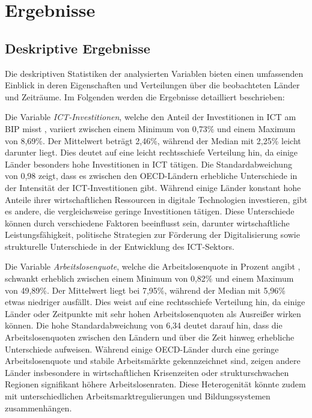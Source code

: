 
\section{Ergebnisse}


\subsection{Deskriptive Ergebnisse}

Die deskriptiven Statistiken der analysierten Variablen bieten einen umfassenden Einblick 
in deren Eigenschaften und Verteilungen über die beobachteten Länder und Zeiträume. Im 
Folgenden werden die Ergebnisse detailliert beschrieben:



Die Variable \textit{\ac{ICT}-Investitionen}, welche den Anteil der Investitionen in 
\ac{ICT} am \ac{BIP} misst \parencite{oecd2022ict}, variiert zwischen einem Minimum von 
0,73\% und einem Maximum von 8,69\%. Der Mittelwert beträgt 2,46\%, während der Median mit 
2,25\% leicht darunter liegt. Dies deutet auf eine leicht rechtsschiefe Verteilung hin, 
da einige Länder besonders hohe Investitionen in \ac{ICT} tätigen. Die Standardabweichung 
von 0,98 zeigt, dass es zwischen den OECD-Ländern erhebliche Unterschiede in der Intensität 
der \ac{ICT}-Investitionen gibt. Während einige Länder konstant hohe Anteile ihrer 
wirtschaftlichen Ressourcen in digitale Technologien investieren, gibt es andere, die 
vergleichsweise geringe Investitionen tätigen. Diese Unterschiede können durch verschiedene 
Faktoren beeinflusst sein, darunter wirtschaftliche Leistungsfähigkeit, politische 
Strategien zur Förderung der Digitalisierung sowie strukturelle Unterschiede in der 
Entwicklung des \ac{ICT}-Sektors.

Die Variable \textit{Arbeitslosenquote}, welche die Arbeitslosenquote in Prozent angibt 
\parencite{oecd2022unemployment}, schwankt erheblich zwischen einem Minimum von 0,82\% und 
einem Maximum von 49,89\%. Der Mittelwert liegt bei 7,95\%, während der Median mit 5,96\% 
etwas niedriger ausfällt. Dies weist auf eine rechtsschiefe Verteilung hin, da einige 
Länder oder Zeitpunkte mit sehr hohen Arbeitslosenquoten als Ausreißer wirken können. Die 
hohe Standardabweichung von 6,34 deutet darauf hin, dass die Arbeitslosenquoten 
zwischen den Ländern und über die Zeit hinweg erhebliche Unterschiede aufweisen. Während 
einige OECD-Länder durch eine geringe Arbeitslosenquote und stabile Arbeitsmärkte 
gekennzeichnet sind, zeigen andere Länder insbesondere in wirtschaftlichen Krisenzeiten 
oder strukturschwachen Regionen signifikant höhere Arbeitslosenraten. Diese Heterogenität 
könnte zudem mit unterschiedlichen Arbeitsmarktregulierungen und Bildungssystemen 
zusammenhängen.


